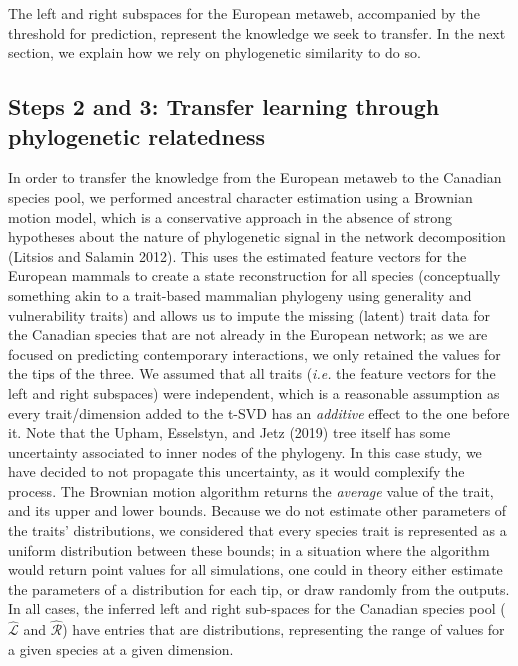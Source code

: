 \documentclass[10pt,oneside]{article}
\begin{document}
The left and right subspaces for the European metaweb, accompanied by
the threshold for prediction, represent the knowledge we seek to
transfer. In the next section, we explain how we rely on phylogenetic
similarity to do so.

\hypertarget{steps-2-and-3-transfer-learning-through-phylogenetic-relatedness}{%
\subsection{Steps 2 and 3: Transfer learning through phylogenetic
relatedness}\label{steps-2-and-3-transfer-learning-through-phylogenetic-relatedness}}

In order to transfer the knowledge from the European metaweb to the
Canadian species pool, we performed ancestral character estimation using
a Brownian motion model, which is a conservative approach in the absence
of strong hypotheses about the nature of phylogenetic signal in the
network decomposition (Litsios and Salamin 2012). This uses the
estimated feature vectors for the European mammals to create a state
reconstruction for all species (conceptually something akin to a
trait-based mammalian phylogeny using generality and vulnerability
traits) and allows us to impute the missing (latent) trait data for the
Canadian species that are not already in the European network; as we are
focused on predicting contemporary interactions, we only retained the
values for the tips of the three. We assumed that all traits
(\emph{i.e.} the feature vectors for the left and right subspaces) were
independent, which is a reasonable assumption as every trait/dimension
added to the t-SVD has an \emph{additive} effect to the one before it.
Note that the Upham, Esselstyn, and Jetz (2019) tree itself has some
uncertainty associated to inner nodes of the phylogeny. In this case
study, we have decided to not propagate this uncertainty, as it would
complexify the process. The Brownian motion algorithm returns the
\emph{average} value of the trait, and its upper and lower bounds.
Because we do not estimate other parameters of the traits'
distributions, we considered that every species trait is represented as
a uniform distribution between these bounds; in a situation where the
algorithm would return point values for all simulations, one could in
theory either estimate the parameters of a distribution for each tip, or
draw randomly from the outputs. In all cases, the inferred left and
right sub-spaces for the Canadian species pool (\(\hat{\mathcal{L}}\)
and \(\hat{\mathcal{R}}\)) have entries that are distributions,
representing the range of values for a given species at a given
dimension.
\end{document}

